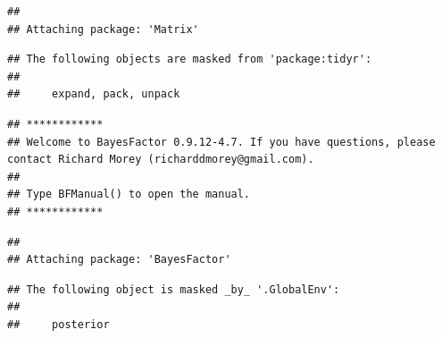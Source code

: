 \documentclass[
]{book}
\begin{document}
\begin{verbatim}
## 
## Attaching package: 'Matrix'
\end{verbatim}

\begin{verbatim}
## The following objects are masked from 'package:tidyr':
## 
##     expand, pack, unpack
\end{verbatim}

\begin{verbatim}
## ************
## Welcome to BayesFactor 0.9.12-4.7. If you have questions, please contact Richard Morey (richarddmorey@gmail.com).
## 
## Type BFManual() to open the manual.
## ************
\end{verbatim}

\begin{verbatim}
## 
## Attaching package: 'BayesFactor'
\end{verbatim}

\begin{verbatim}
## The following object is masked _by_ '.GlobalEnv':
## 
##     posterior
\end{verbatim}
\end{document}
